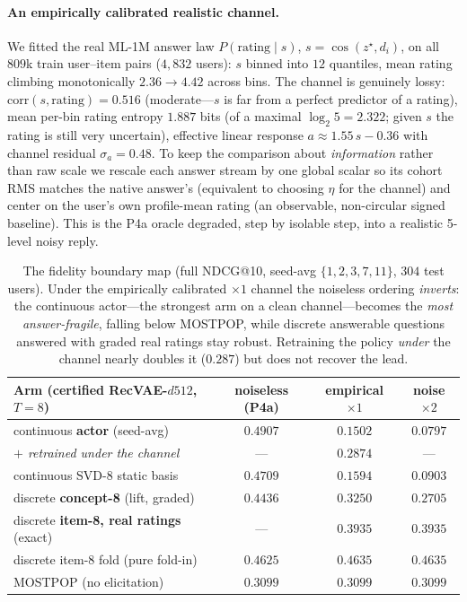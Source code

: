 \documentclass[11pt]{article}
\begin{document}
\paragraph{An empirically calibrated realistic channel.} We fitted the real ML-1M answer law $P(\text{rating}\mid s)$,
$s=\cos(z^\star,d_i)$, on all $809$k train user--item pairs ($4{,}832$ users): $s$ binned into $12$ quantiles, mean rating
climbing monotonically $2.36\!\to\!4.42$ across bins. The channel is genuinely lossy: $\mathrm{corr}(s,\text{rating})=0.516$
(moderate---$s$ is far from a perfect predictor of a rating), mean per-bin rating entropy $1.887$ bits (of a maximal
$\log_2 5 = 2.322$; given $s$ the rating is still very uncertain), effective linear response $a\approx1.55\,s-0.36$ with
channel residual $\sigma_a=0.48$. To keep the comparison about \emph{information} rather than raw scale we rescale each
answer stream by one global scalar so its cohort RMS matches the native answer's (equivalent to choosing $\eta$ for the
channel) and center on the user's own profile-mean rating (an observable, non-circular signed baseline). This is the P4a
oracle degraded, step by isolable step, into a realistic 5-level noisy reply.

\begin{table}[h]\centering
\begin{tabular}{lccc}
\toprule
Arm (certified RecVAE-$d512$, $T{=}8$) & noiseless (P4a) & \textbf{empirical $\times1$} & noise $\times2$ \\
\midrule
continuous \textbf{actor} (seed-avg) & $0.4907$ & $\mathbf{0.1502}$ & $0.0797$ \\
\quad\emph{$+$ retrained under the channel} & --- & $\mathit{0.2874}$ & --- \\
continuous SVD-8 static basis & $0.4709$ & $0.1594$ & $0.0903$ \\
discrete \textbf{concept-8} (lift, graded) & $0.4436$ & $\mathbf{0.3250}$ & $0.2705$ \\
discrete \textbf{item-8, real ratings} (exact) & --- & $\mathbf{0.3935}$ & $0.3935$ \\
discrete item-8 fold (pure fold-in) & $0.4625$ & $0.4635$ & $0.4635$ \\
MOSTPOP (no elicitation) & $0.3099$ & $0.3099$ & $0.3099$ \\
\bottomrule
\end{tabular}
\caption{The fidelity boundary map (full NDCG@10, seed-avg $\{1,2,3,7,11\}$, $304$ test users). Under the empirically
calibrated $\times1$ channel the noiseless ordering \emph{inverts}: the continuous actor---the strongest arm on a clean
channel---becomes the \emph{most answer-fragile}, falling below MOSTPOP, while discrete answerable questions answered with
graded real ratings stay robust. Retraining the policy \emph{under} the channel nearly doubles it ($0.287$) but does not
recover the lead.}\label{tab:i2fidelity}
\end{table}
\end{document}
